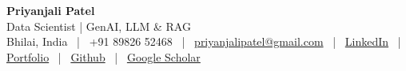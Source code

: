 \documentclass[9pt]{extarticle}
\begin{document}
\raggedbottom
\justifying
\fontsize{8.7}{10.6}\selectfont

\begin{center}
  {\fontsize{22}{24}\selectfont\bfseries Priyanjali Patel}\\[2pt]
  {\color{accent}\fontsize{10.5}{13}\selectfont Data Scientist | GenAI, LLM \& RAG}\\[3pt]
  {\fontsize{8.6}{11}\selectfont
    Bhilai, India ~|~ +91 89826 52468 ~|~
    \href{mailto:priyanjalipatel@gmail.com}{priyanjalipatel@gmail.com} ~|~
    \href{https://linkedin.com/in/priyanjalipatel}{LinkedIn} ~|~
    \href{https://priyanjalipatel.github.io}{Portfolio} ~|~
    \href{https://github.com/priyanjalipatel}{Github} ~|~
    \href{https://scholar.google.com/citations?user=Ola1DfwAAAAJ}{Google Scholar}}
\end{center}
\vspace{4pt}
\noindent{\color{accent}\rule{\textwidth}{1.1pt}}
\vspace{6pt}
\end{document}
